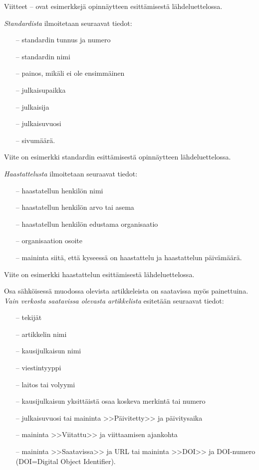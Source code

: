 \documentclass[english,12pt,a4paper,pdftex,elec,utf8]{aaltothesis}
\begin{document}
Viitteet \cite{Miinusmaa}--\cite{Lonnqvist} ovat esimerkkej\"a
opinn\"aytteen esitt\"amisest\"a l\"ahdeluettelossa.

\textit{Standardista} ilmoitetaan seuraavat tiedot:

\begin{itemize}
\item[--]standardin tunnus ja numero
\item[--]standardin nimi
\item[--]painos, mik\"ali ei ole ensimm\"ainen
\item[--]julkaisupaikka
\item[--]julkaisija
\item[--]julkaisuvuosi
\item[--]sivum\"a\"ar\"a.
\end{itemize}
Viite \cite{sfs} on esimerkki standardin esitt\"amisest\"a opinn\"aytteen
l\"ahdeluettelossa.

\textit{Haastattelusta} ilmoitetaan seuraavat tiedot:

\begin{itemize}
\item[--]haastatellun henkil\"on nimi
\item[--]haastatellun henkil\"on arvo tai asema
\item[--]haastatellun henkil\"on edustama organisaatio
\item[--]organisaation osoite
\item[--]maininta siit\"a, ett\"a kyseess\"a on haastattelu ja haastattelun
p\"aiv\"am\"a\"ar\"a.
\end{itemize}

Viite \cite{haastattelu} on esimerkki
haastattelun esitt\"amisest\"a l\"ahdeluettelossa.

Osa s\"ahk\"oisess\"a muodossa olevista artikkeleista on saatavissa my\"os
painettuina. \textit{Vain verkosta saatavissa olevasta artikkelista} esitet\"a\"an
seuraavat tiedot:

\begin{itemize}
\item[--]tekij\"at
\item[--]artikkelin nimi
\item[--]kausijulkaisun nimi
\item[--]viestintyyppi
\item[--]laitos tai volyymi
\item[--]kausijulkaisun yksitt\"aist\"a osaa koskeva merkint\"a tai numero
\item[--]julkaisuvuosi tai maininta >>P\"aivitetty>> ja p\"aivitysaika
\item[--]maininta >>Viitattu>> ja viittaamisen ajankohta
\item[--]maininta >>Saatavissa>> ja URL tai
        maininta >>DOI>> ja DOI-numero (DOI=Digital Object Identifier).
\end{itemize}
\end{document}
